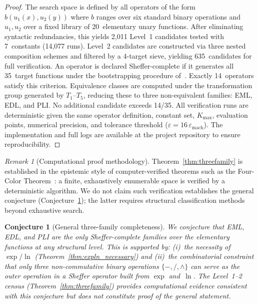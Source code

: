 \documentclass[10pt,twocolumn]{article}
\newtheorem{conjecture}{Conjecture}
\theoremstyle{remark}
\newtheorem*{remark}{Remark}
\begin{document}
\begin{proof}
The search space is defined by all operators of the form $b(u_1(x), u_2(y))$ where $b$ ranges over six standard binary operations and $u_1, u_2$ over a fixed library of 20~elementary unary functions. After eliminating syntactic redundancies, this yields 2{,}011 Level~1 candidates tested with 7~constants (14{,}077 runs). Level~2 candidates are constructed via three nested composition schemes and filtered by a 4-target sieve, yielding 635~candidates for full verification. An operator is declared Sheffer-complete if it generates all 35~target functions under the bootstrapping procedure of~\cite{odrzywołek2026}. Exactly 14~operators satisfy this criterion. Equivalence classes are computed under the transformation group generated by $T_1$--$T_5$, reducing these to three non-equivalent families: EML, EDL, and PLI. No additional candidate exceeds 14/35. All verification runs are deterministic given the same operator definition, constant set, $K_{\max}$, evaluation points, numerical precision, and tolerance threshold ($\varepsilon = 16\,\varepsilon_{\mathrm{mach}}$). The implementation and full logs are available at the project repository to ensure reproducibility.
\end{proof}

\begin{remark}[Computational proof methodology]
Theorem~\ref{thm:threefamily} is established in the epistemic style of computer-verified theorems such as the Four-Color Theorem~\cite{appel_haken_1976}: a finite, exhaustively enumerable space is verified by a deterministic algorithm. We do not claim such verification establishes the general conjecture (Conjecture~\ref{conj:threefamily}); the latter requires structural classification methods beyond exhaustive search.
\end{remark}

\begin{conjecture}[General three-family completeness]\label{conj:threefamily}
We conjecture that EML, EDL, and PLI are the only Sheffer-complete families over the elementary functions at any structural level. This is supported by: (i)~the necessity of $\exp/\ln$ (Theorem~\ref{thm:expln_necessary}) and (ii)~the combinatorial constraint that only three non-commutative binary operations $\{-,/,\wedge\}$ can serve as the outer operation in a Sheffer operator built from $\exp$ and~$\ln$. The Level~1--2 census (Theorem~\ref{thm:threefamily}) provides computational evidence consistent with this conjecture but does not constitute proof of the general statement.
\end{conjecture}
\end{document}
